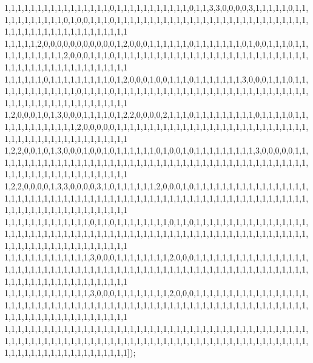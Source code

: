 1,1,1,1,1,1,1,1,1,1,1,1,1,1,1,1,0,1,1,1,1,1,1,1,1,1,1,1,0,1,1,3,3,0,0,0,0,3,1,1,1,1,1,0,1,1,1,1,1,1,1,1,1,1,1,0,1,0,0,1,1,1,0,1,1,1,1,1,1,1,1,1,1,1,1,1,1,1,1,1,1,1,1,1,1,1,1,1,1,1,1,1,1,1,1,1,1,1,1,1,1,1,1,1,1,1,1,1,1,1,1
1,1,1,1,1,2,0,0,0,0,0,0,0,0,0,0,0,1,2,0,0,0,1,1,1,1,1,1,0,1,1,1,1,1,1,1,0,1,0,0,1,1,1,0,1,1,1,1,1,1,1,1,1,1,1,2,0,0,0,1,1,1,0,1,1,1,1,1,1,1,1,1,1,1,1,1,1,1,1,1,1,1,1,1,1,1,1,1,1,1,1,1,1,1,1,1,1,1,1,1,1,1,1,1,1,1,1,1,1,1,1
1,1,1,1,1,1,0,1,1,1,1,1,1,1,1,1,0,1,2,0,0,0,1,0,0,1,1,1,0,1,1,1,1,1,1,1,3,0,0,0,1,1,1,0,1,1,1,1,1,1,1,1,1,1,1,1,1,0,1,1,1,1,0,1,1,1,1,1,1,1,1,1,1,1,1,1,1,1,1,1,1,1,1,1,1,1,1,1,1,1,1,1,1,1,1,1,1,1,1,1,1,1,1,1,1,1,1,1,1,1,1
1,2,0,0,0,1,0,1,3,0,0,0,1,1,1,1,0,1,2,2,0,0,0,0,2,1,1,1,0,1,1,1,1,1,1,1,1,1,0,1,1,1,1,0,1,1,1,1,1,1,1,1,1,1,1,1,1,2,0,0,0,0,0,1,1,1,1,1,1,1,1,1,1,1,1,1,1,1,1,1,1,1,1,1,1,1,1,1,1,1,1,1,1,1,1,1,1,1,1,1,1,1,1,1,1,1,1,1,1,1,1
1,2,2,0,0,1,0,1,3,0,0,0,1,0,0,1,0,1,1,1,1,1,1,0,1,0,0,1,0,1,1,1,1,1,1,1,1,1,3,0,0,0,0,0,1,1,1,1,1,1,1,1,1,1,1,1,1,1,1,1,1,1,1,1,1,1,1,1,1,1,1,1,1,1,1,1,1,1,1,1,1,1,1,1,1,1,1,1,1,1,1,1,1,1,1,1,1,1,1,1,1,1,1,1,1,1,1,1,1,1,1
1,2,2,0,0,0,0,1,3,3,0,0,0,0,3,1,0,1,1,1,1,1,1,2,0,0,0,1,0,1,1,1,1,1,1,1,1,1,1,1,1,1,1,1,1,1,1,1,1,1,1,1,1,1,1,1,1,1,1,1,1,1,1,1,1,1,1,1,1,1,1,1,1,1,1,1,1,1,1,1,1,1,1,1,1,1,1,1,1,1,1,1,1,1,1,1,1,1,1,1,1,1,1,1,1,1,1,1,1,1,1
1,1,1,1,1,1,1,1,1,1,1,1,1,0,1,1,0,1,1,1,1,1,1,1,1,0,1,1,0,1,1,1,1,1,1,1,1,1,1,1,1,1,1,1,1,1,1,1,1,1,1,1,1,1,1,1,1,1,1,1,1,1,1,1,1,1,1,1,1,1,1,1,1,1,1,1,1,1,1,1,1,1,1,1,1,1,1,1,1,1,1,1,1,1,1,1,1,1,1,1,1,1,1,1,1,1,1,1,1,1,1
1,1,1,1,1,1,1,1,1,1,1,1,1,3,0,0,0,1,1,1,1,1,1,1,1,2,0,0,0,1,1,1,1,1,1,1,1,1,1,1,1,1,1,1,1,1,1,1,1,1,1,1,1,1,1,1,1,1,1,1,1,1,1,1,1,1,1,1,1,1,1,1,1,1,1,1,1,1,1,1,1,1,1,1,1,1,1,1,1,1,1,1,1,1,1,1,1,1,1,1,1,1,1,1,1,1,1,1,1,1,1
1,1,1,1,1,1,1,1,1,1,1,1,1,3,0,0,0,1,1,1,1,1,1,1,1,2,0,0,0,1,1,1,1,1,1,1,1,1,1,1,1,1,1,1,1,1,1,1,1,1,1,1,1,1,1,1,1,1,1,1,1,1,1,1,1,1,1,1,1,1,1,1,1,1,1,1,1,1,1,1,1,1,1,1,1,1,1,1,1,1,1,1,1,1,1,1,1,1,1,1,1,1,1,1,1,1,1,1,1,1,1
1,1,1,1,1,1,1,1,1,1,1,1,1,1,1,1,1,1,1,1,1,1,1,1,1,1,1,1,1,1,1,1,1,1,1,1,1,1,1,1,1,1,1,1,1,1,1,1,1,1,1,1,1,1,1,1,1,1,1,1,1,1,1,1,1,1,1,1,1,1,1,1,1,1,1,1,1,1,1,1,1,1,1,1,1,1,1,1,1,1,1,1,1,1,1,1,1,1,1,1,1,1,1,1,1,1,1,1,1,1,1]);
